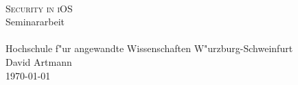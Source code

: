 \documentclass[12pt,a4paper]{scrartcl}
\begin{document}
	

\begin{titlepage}
   	\mbox{}\vspace{5\baselineskip}\\
   	\rmfamily\huge
   	\centering
	\textsc{Security in iOS}
	\\[3ex]
   	Seminararbeit
   	\rmfamily\Large
   	\vspace{1\baselineskip}\\
   	\mbox{}
	\vspace{3\baselineskip}\\
	Hochschule f"ur angewandte Wissenschaften W"urzburg-Schweinfurt
   	\vspace{5\baselineskip}\\
   	\rmfamily\Large
   	David Artmann
   	\vspace{1\baselineskip}\\
   	\today
\end{titlepage}

	\tableofcontents
	\newpage
	
	\listoffigures
	\newpage
	
\end{document}
